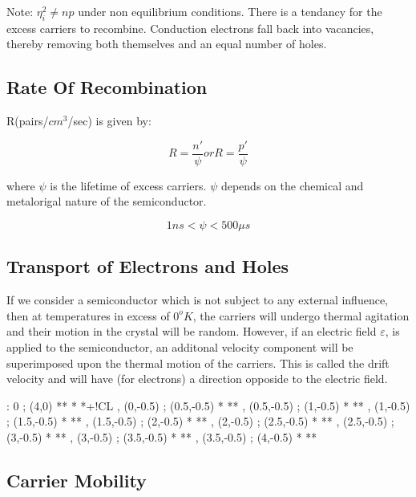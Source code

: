 \documentclass[a4paper,12pt]{article}
\begin{document}
Note: $\eta_{i}^{2} \neq np$ under non equilibrium conditions.
There is a tendancy for the excess carriers to recombine. Conduction
electrons fall back into vacancies, thereby removing both themselves and
an equal number of holes.

\subsection{Rate Of Recombination}

R(pairs/$cm^{3}$/sec) is given by:

\[ R = \frac{n'}{\psi} or R = \frac{p'}{\psi} \]

where $\psi$ is the lifetime of excess carriers. $\psi$ depends on the
chemical and metalorigal nature of the semiconductor.

\[ 1 ns < \psi < 500 \mu s \]

\subsection{Transport of Electrons and Holes}

If we consider a semiconductor which is not subject to any external
influence, then at temperatures in excess of $0^{o}K$, the carriers will
undergo thermal agitation and their motion in the crystal will be
random. However, if an electric field $\varepsilon$, is applied to the
semiconductor, an additonal velocity component will be superimposed upon
the thermal motion of the carriers. This is called the drift velocity
and will have (for electrons) a direction opposide to the electric
field.

\begin{table}[hbtp]

\xy <1cm,0cm>:
0 ; (4,0) **\dir{-} *\dir{>} *+!CL{\varepsilon} ,
(0,-0.5) ; (0.5,-0.5) *\dir{<} **\dir{--} ,
(0.5,-0.5) ; (1,-0.5) *\dir{<} **\dir{--} ,
(1,-0.5) ; (1.5,-0.5) *\dir{<} **\dir{--} ,
(1.5,-0.5) ; (2,-0.5) *\dir{<} **\dir{--} ,
(2,-0.5) ; (2.5,-0.5) *\dir{<} **\dir{--} ,
(2.5,-0.5) ; (3,-0.5) *\dir{<} **\dir{--} ,
(3,-0.5) ; (3.5,-0.5) *\dir{<} **\dir{--} ,
(3.5,-0.5) ; (4,-0.5) *\dir{<} **\dir{--}
\endxy

\end{table}


\subsection{Carrier Mobility}
\end{document}
